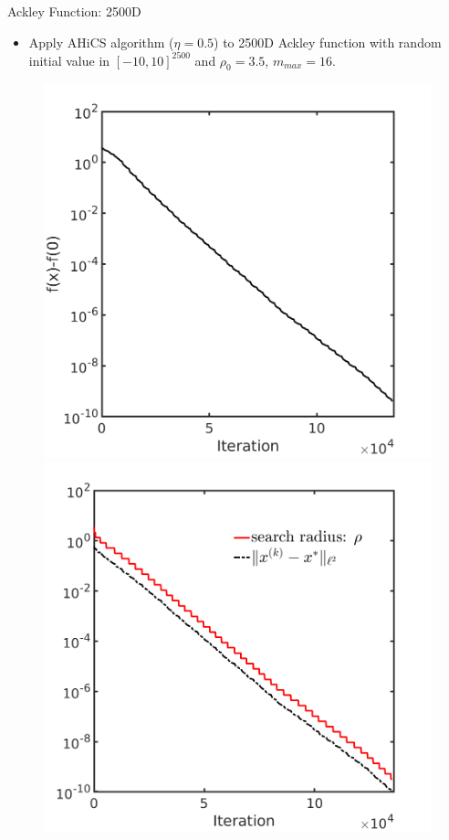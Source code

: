 \documentclass{beamer}
\begin{document}
\begin{frame}{Ackley Function: 2500D}
\footnotesize{
	\begin{itemize}
		\item Apply AHiCS algorithm ($\eta=0.5$) to 2500D Ackley function with
			random initial value in  $[-10,10]^{2500}$ and $\rho_0 = 3.5$, $m_{max}=16$.
	\end{itemize}
	}
\begin{figure}[!htbp]
	\centering
	  \includegraphics[scale=0.25]{./figures/ackley2500D.png}
	  \includegraphics[scale=0.25]{./figures/ackley2500D_dist.png}
\end{figure}


\end{frame}
\end{document}

